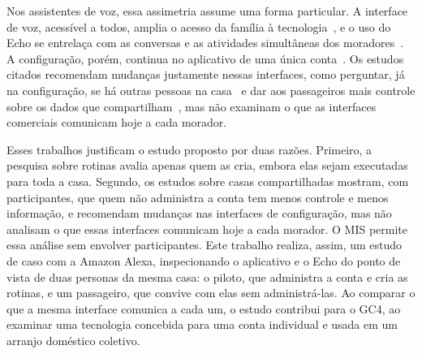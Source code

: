 Nos assistentes de voz, essa assimetria assume uma forma particular. A
interface de voz, acessível a todos, amplia o acesso da família à
tecnologia~\cite{beneteau2020parenting}, e o uso do Echo se entrelaça com
as conversas e as atividades simultâneas dos
moradores~\cite{porcheron2018voice}. A configuração, porém, continua no
aplicativo de uma única conta~\cite{barricelli2024routines}. Os estudos
citados recomendam mudanças justamente nessas interfaces, como perguntar,
já na configuração, se há outras pessoas na casa~\cite{geeng2019control}
e dar aos passageiros mais controle sobre os dados que
compartilham~\cite{koshy2021passenger}, mas não examinam o que as
interfaces comerciais comunicam hoje a cada morador.

Esses trabalhos justificam o estudo proposto por duas razões. Primeiro, a
pesquisa sobre rotinas avalia apenas quem as cria, embora elas sejam
executadas para toda a casa. Segundo, os estudos sobre casas
compartilhadas mostram, com participantes, que quem não administra a
conta tem menos controle e menos informação, e recomendam mudanças nas
interfaces de configuração, mas não analisam o que essas interfaces
comunicam hoje a cada morador. O MIS permite essa análise sem envolver
participantes. Este trabalho realiza, assim, um estudo de caso com a
Amazon Alexa, inspecionando o aplicativo e o Echo do ponto de vista de
duas personas da mesma casa: o piloto, que administra a conta e cria as
rotinas, e um passageiro, que convive com elas sem administrá-las. Ao
comparar o que a mesma interface comunica a cada um, o estudo contribui
para o GC4, ao examinar uma tecnologia concebida para uma conta
individual e usada em um arranjo doméstico coletivo.
